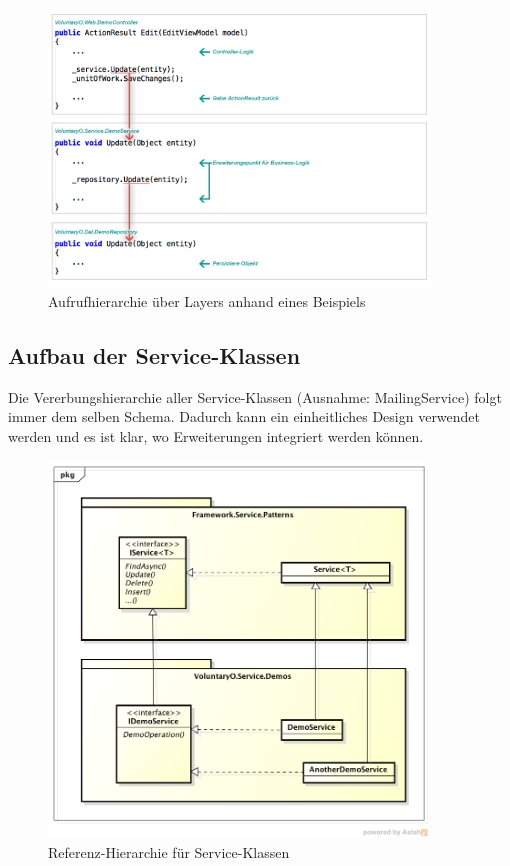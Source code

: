 	\begin{figure}[H]
	    	\centering
	    	 \includegraphics[width=0.9\textwidth]{content/architekturdokumentation/images/Service_Framework_Code.png}
	  		\vspace{-15pt}
			\caption{Aufrufhierarchie über Layers anhand eines Beispiels}
	\end{figure}
	
	\subsection{Aufbau der Service-Klassen}
	Die Vererbungshierarchie aller Service-Klassen (Ausnahme: MailingService) folgt immer dem selben Schema. Dadurch kann ein einheitliches Design verwendet werden und es ist klar, wo Erweiterungen integriert werden können.
	
	\begin{figure}[H]
	    	\centering
	    	 \includegraphics[width=0.9\textwidth]{content/architekturdokumentation/images/Service_Class_Hierarchy.png}
	  		\vspace{-15pt}
			\caption{Referenz-Hierarchie für Service-Klassen}
	\end{figure}
	
